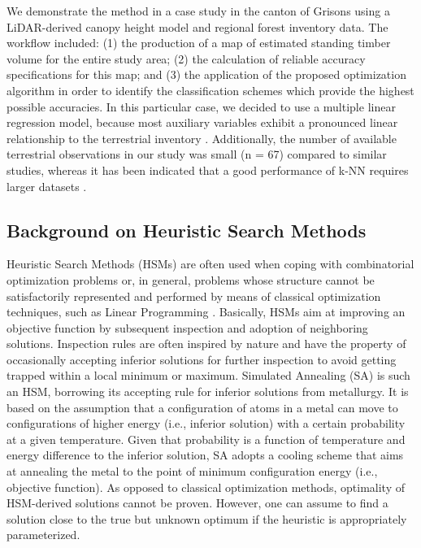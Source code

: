 We demonstrate the method in a case study in the canton of Grisons using a LiDAR-derived canopy height model and regional forest inventory data. The workflow included: (1) the production of a map of estimated standing timber volume for the entire study area; (2) the calculation of reliable accuracy specifications for this map; and (3) the application of the proposed optimization algorithm in order to identify the classification schemes which provide the highest possible accuracies. In this particular case, we decided to use a multiple linear regression model, because most auxiliary variables exhibit a pronounced linear relationship to the terrestrial inventory \citep{hill2013}. Additionally, the number of available terrestrial observations in our study was small (n = 67) compared to similar studies, whereas it has been indicated that a good performance of k-NN requires larger datasets \citep{fehrmann2008, magnussen2010}.

\subsection{Background on Heuristic Search Methods}
\label{sec:HSM_theory}

Heuristic Search Methods (HSMs) are often used when coping with combinatorial optimization problems \citep{pirlot1996} or, in general, problems whose structure cannot be satisfactorily represented and performed by means of classical optimization techniques, such as Linear Programming \citep{rayward1996}. Basically, HSMs aim at improving an objective function by subsequent inspection and adoption of neighboring solutions. Inspection rules are often inspired by nature \citep{pirlot1996} and have the property of occasionally accepting inferior solutions for further inspection to avoid getting trapped within a local minimum or maximum. Simulated Annealing (SA) \citep{kirkpatrick1983} is such an HSM, borrowing its accepting rule for inferior solutions from metallurgy. It is based on the assumption that a configuration of atoms in a metal can move to configurations of higher energy (i.e., inferior solution) with a certain probability at a given temperature. Given that probability is a function of temperature and energy difference to the inferior solution, SA adopts a cooling scheme that aims at annealing the metal to the point of minimum configuration energy (i.e., objective function). As opposed to classical optimization methods, optimality of HSM-derived solutions cannot be proven. However, one can assume to find a solution close to the true but unknown optimum if the heuristic is appropriately parameterized.

